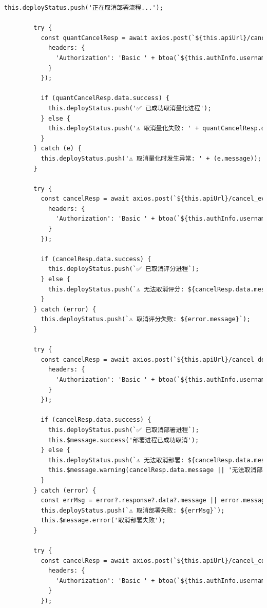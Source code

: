 \documentclass[AutoFakeBold,AutoFakeSlant,language=chinese,degree=bachelor]{sustechthesis}
\begin{document}
\begin{itemize}
\begin{lstlisting}[language=HTML]
        this.deployStatus.push('正在取消部署流程...');

        try {
          const quantCancelResp = await axios.post(`${this.apiUrl}/cancel_quant`, {}, {
            headers: {
              'Authorization': 'Basic ' + btoa(`${this.authInfo.username}:${this.authInfo.password}`)
            }
          });

          if (quantCancelResp.data.success) {
            this.deployStatus.push('✅ 已成功取消量化进程');
          } else {
            this.deployStatus.push('⚠️ 取消量化失败: ' + quantCancelResp.data.message);
          }
        } catch (e) {
          this.deployStatus.push('⚠️ 取消量化时发生异常: ' + (e.message));
        }

        try {
          const cancelResp = await axios.post(`${this.apiUrl}/cancel_eval`, {}, {
            headers: {
              'Authorization': 'Basic ' + btoa(`${this.authInfo.username}:${this.authInfo.password}`)
            }
          });

          if (cancelResp.data.success) {
            this.deployStatus.push(`✅ 已取消评分进程`);
          } else {
            this.deployStatus.push(`⚠️ 无法取消评分: ${cancelResp.data.message}`);
          }
        } catch (error) {
          this.deployStatus.push(`⚠️ 取消评分失败: ${error.message}`);
        }

        try {
          const cancelResp = await axios.post(`${this.apiUrl}/cancel_deployment`, {}, {
            headers: {
              'Authorization': 'Basic ' + btoa(`${this.authInfo.username}:${this.authInfo.password}`)
            }
          });

          if (cancelResp.data.success) {
            this.deployStatus.push(`✅ 已取消部署进程`);
            this.$message.success('部署进程已成功取消');
          } else {
            this.deployStatus.push(`⚠️ 无法取消部署: ${cancelResp.data.message}`);
            this.$message.warning(cancelResp.data.message || '无法取消部署进程');
          }
        } catch (error) {
          const errMsg = error?.response?.data?.message || error.message;
          this.deployStatus.push(`⚠️ 取消部署失败: ${errMsg}`);
          this.$message.error('取消部署失败');
        }

        try {
          const cancelResp = await axios.post(`${this.apiUrl}/cancel_compile`, {}, {
            headers: {
              'Authorization': 'Basic ' + btoa(`${this.authInfo.username}:${this.authInfo.password}`)
            }
          });


\end{lstlisting}
\end{itemize}
\end{document}
